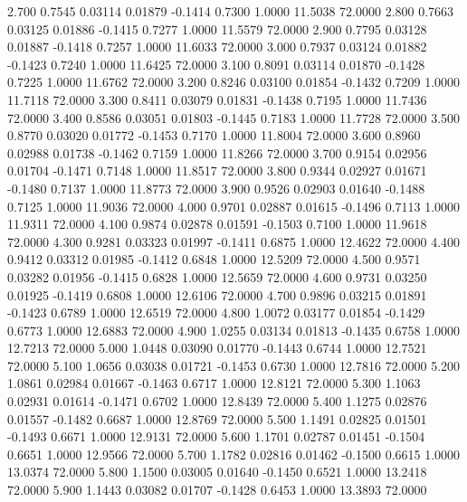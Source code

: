    2.700   0.7545   0.03114   0.01879  -0.1414   0.7300   1.0000  11.5038  72.0000
   2.800   0.7663   0.03125   0.01886  -0.1415   0.7277   1.0000  11.5579  72.0000
   2.900   0.7795   0.03128   0.01887  -0.1418   0.7257   1.0000  11.6033  72.0000
   3.000   0.7937   0.03124   0.01882  -0.1423   0.7240   1.0000  11.6425  72.0000
   3.100   0.8091   0.03114   0.01870  -0.1428   0.7225   1.0000  11.6762  72.0000
   3.200   0.8246   0.03100   0.01854  -0.1432   0.7209   1.0000  11.7118  72.0000
   3.300   0.8411   0.03079   0.01831  -0.1438   0.7195   1.0000  11.7436  72.0000
   3.400   0.8586   0.03051   0.01803  -0.1445   0.7183   1.0000  11.7728  72.0000
   3.500   0.8770   0.03020   0.01772  -0.1453   0.7170   1.0000  11.8004  72.0000
   3.600   0.8960   0.02988   0.01738  -0.1462   0.7159   1.0000  11.8266  72.0000
   3.700   0.9154   0.02956   0.01704  -0.1471   0.7148   1.0000  11.8517  72.0000
   3.800   0.9344   0.02927   0.01671  -0.1480   0.7137   1.0000  11.8773  72.0000
   3.900   0.9526   0.02903   0.01640  -0.1488   0.7125   1.0000  11.9036  72.0000
   4.000   0.9701   0.02887   0.01615  -0.1496   0.7113   1.0000  11.9311  72.0000
   4.100   0.9874   0.02878   0.01591  -0.1503   0.7100   1.0000  11.9618  72.0000
   4.300   0.9281   0.03323   0.01997  -0.1411   0.6875   1.0000  12.4622  72.0000
   4.400   0.9412   0.03312   0.01985  -0.1412   0.6848   1.0000  12.5209  72.0000
   4.500   0.9571   0.03282   0.01956  -0.1415   0.6828   1.0000  12.5659  72.0000
   4.600   0.9731   0.03250   0.01925  -0.1419   0.6808   1.0000  12.6106  72.0000
   4.700   0.9896   0.03215   0.01891  -0.1423   0.6789   1.0000  12.6519  72.0000
   4.800   1.0072   0.03177   0.01854  -0.1429   0.6773   1.0000  12.6883  72.0000
   4.900   1.0255   0.03134   0.01813  -0.1435   0.6758   1.0000  12.7213  72.0000
   5.000   1.0448   0.03090   0.01770  -0.1443   0.6744   1.0000  12.7521  72.0000
   5.100   1.0656   0.03038   0.01721  -0.1453   0.6730   1.0000  12.7816  72.0000
   5.200   1.0861   0.02984   0.01667  -0.1463   0.6717   1.0000  12.8121  72.0000
   5.300   1.1063   0.02931   0.01614  -0.1471   0.6702   1.0000  12.8439  72.0000
   5.400   1.1275   0.02876   0.01557  -0.1482   0.6687   1.0000  12.8769  72.0000
   5.500   1.1491   0.02825   0.01501  -0.1493   0.6671   1.0000  12.9131  72.0000
   5.600   1.1701   0.02787   0.01451  -0.1504   0.6651   1.0000  12.9566  72.0000
   5.700   1.1782   0.02816   0.01462  -0.1500   0.6615   1.0000  13.0374  72.0000
   5.800   1.1500   0.03005   0.01640  -0.1450   0.6521   1.0000  13.2418  72.0000
   5.900   1.1443   0.03082   0.01707  -0.1428   0.6453   1.0000  13.3893  72.0000
